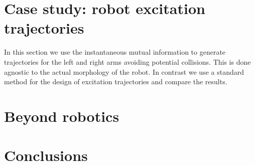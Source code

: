 \section{Case study: robot excitation trajectories}
\TODO
In this section we use the instantaneous mutual information to generate trajectories for the left and right arms avoiding potential collisions. This is done agnostic to the actual morphology of the robot. In contrast we use a standard method for the design of excitation trajectories and compare the results.

\section{Beyond robotics}
\TODO

\section{Conclusions}\label{sec:conclusion}



\printbibliography 
